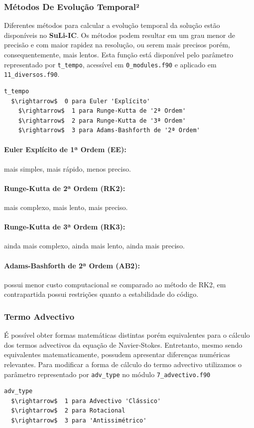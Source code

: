 \documentclass[12pt, a4paper]{article}
\newcommand{\SLIC}{{\bf SuLi-IC}}
\begin{document}
\subsubsection{Métodos De Evolução Temporal²}
Diferentes métodos para calcular a evolução temporal da solução estão disponíveis no \SLIC. Os métodos podem resultar em um grau menor de precisão e com maior rapidez na resolução, ou serem mais precisos porém, consequentemente, mais lentos. Esta função está disponível pelo parâmetro representado por \verb|t_tempo|, acessível em \verb|0_modules.f90| e aplicado em \verb|11_diversos.f90|.
\begin{lstlisting}[escapeinside='']
t_tempo	
  $\rightarrow$  0 para Euler 'Explícito'
	$\rightarrow$  1 para Runge-Kutta de '2ª Ordem'
	$\rightarrow$  2 para Runge-Kutta de '3ª Ordem'
	$\rightarrow$  3 para Adams-Bashforth de '2ª Ordem'
\end{lstlisting}

\paragraph{Euler Explícito de 1ª Ordem (EE):} mais simples, mais rápido, menos preciso.
\paragraph{Runge-Kutta de 2ª Ordem (RK2):} mais complexo, mais lento, mais preciso.
\paragraph{Runge-Kutta de 3ª Ordem (RK3):} ainda mais complexo, ainda mais lento, ainda mais preciso.
\paragraph{Adams-Bashforth de 2ª Ordem (AB2):} possui menor custo computacional se comparado ao método de RK2, em contrapartida possui restrições quanto a estabilidade do código.

\subsubsection{Termo Advectivo}

É possível obter formas matemáticas distintas porém equivalentes para o cálculo dos termos advectivos da equação de Navier-Stokes. Entretanto, mesmo sendo equivalentes matematicamente, possudem apresentar diferenças numéricas relevantes. Para modificar a forma de cálculo do termo advectivo utilizamos o parâmetro representado por \verb|adv_type| no módulo \verb|7_advectivo.f90|
\begin{lstlisting}[escapeinside='']
adv_type  
  $\rightarrow$  1 para Advectivo 'Clássico'
  $\rightarrow$  2 para Rotacional
  $\rightarrow$  3 para 'Antissimétrico'
\end{lstlisting}
\end{document}
